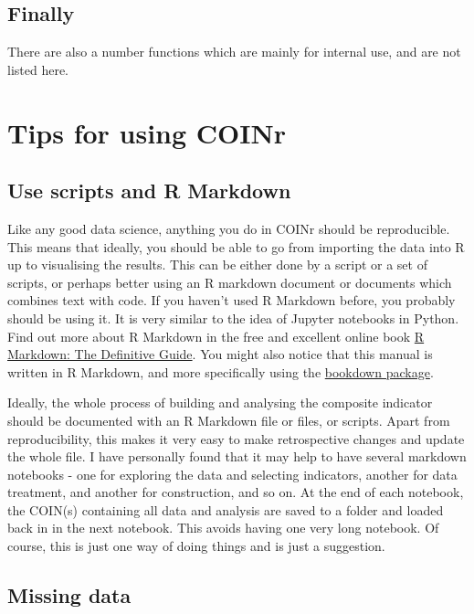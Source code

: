 \documentclass[
]{book}
\begin{document}
\hypertarget{finally}{%
\subsection{Finally}\label{finally}}

There are also a number functions which are mainly for internal use, and are not listed here.

\hypertarget{tips-for-using-coinr}{%
\section{Tips for using COINr}\label{tips-for-using-coinr}}

\hypertarget{use-scripts-and-r-markdown}{%
\subsection{Use scripts and R Markdown}\label{use-scripts-and-r-markdown}}

Like any good data science, anything you do in COINr should be reproducible. This means that ideally, you should be able to go from importing the data into R up to visualising the results. This can be either done by a script or a set of scripts, or perhaps better using an R markdown document or documents which combines text with code. If you haven't used R Markdown before, you probably should be using it. It is very similar to the idea of Jupyter notebooks in Python. Find out more about R Markdown in the free and excellent online book \href{https://bookdown.org/yihui/rmarkdown/}{R Markdown: The Definitive Guide}. You might also notice that this manual is written in R Markdown, and more specifically using the \href{https://bookdown.org/yihui/bookdown/}{bookdown package}.

Ideally, the whole process of building and analysing the composite indicator should be documented with an R Markdown file or files, or scripts. Apart from reproducibility, this makes it very easy to make retrospective changes and update the whole file. I have personally found that it may help to have several markdown notebooks - one for exploring the data and selecting indicators, another for data treatment, and another for construction, and so on. At the end of each notebook, the COIN(s) containing all data and analysis are saved to a folder and loaded back in in the next notebook. This avoids having one very long notebook. Of course, this is just one way of doing things and is just a suggestion.

\hypertarget{missing-data}{%
\subsection{Missing data}\label{missing-data}}
\end{document}
